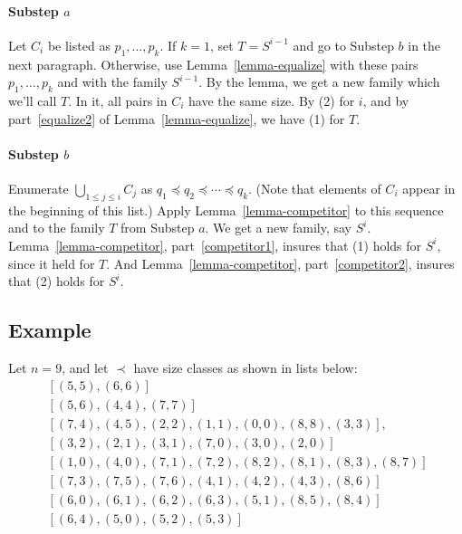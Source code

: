 \documentclass[12pt]{article}
\theoremstyle{definition}
\newcommand{\rem}[1]{\relax}
\begin{document}
 \paragraph{Substep $a$}
 Let $C_i$ be listed as $p_1, \ldots, p_k$.
 If $k = 1$, set $T = S^{i-1}$ and go to  Substep $b$ in the 
 next paragraph.  Otherwise, 
  use Lemma~\ref{lemma-equalize} with these pairs 
  $p_1, \ldots, p_k$ and with the family
  $S^{i-1}$.
  By the lemma, we get a new family which we'll call $T$.
  In it, all pairs in $C_i$ have the same size.
 By (2) for $i$, and by part~\ref{equalize2} of Lemma~\ref{lemma-equalize},
 we have (1) for $T$.
  
 \paragraph{Substep $b$}  
Enumerate $\bigcup_{1\leq j \leq i} C_j$ as 
$q_1 \preceq q_2\preceq \cdots \preceq q_k$.
(Note that elements of $C_i$
appear in the beginning of this list.)
Apply Lemma~\ref{lemma-competitor}
to this sequence and to the family $T$
from Substep $a$.  We get a new family, say 
$S^i$.  
Lemma~\ref{lemma-competitor}, part~\ref{competitor1}, insures that (1) holds for $S^i$, since it held for $T$.
 And Lemma~\ref{lemma-competitor}, part~\ref{competitor2},
 insures that (2) holds for $S^i$.
 
 
 \subsection{Example}
 
 \rem{
 task6 = [[(5,5),(6,6)], [(5,6),(4,4),(7,7)], 
         [(7,4),(4,5),(2, 2),(1,1),(0,0),(8,8), (3,3)], [(3, 2),  (2, 1),(3, 1),(7,0),(3, 0), (2, 0)],
	    [(1, 0), (4,0),(7,1),(7,2), (8,2),(8,1), (8,3), (8,7)], 
         [(7,3), (7,5),(7,6),(4,1),(4,2), (4,3), (8,6)],
	    [(6,0),(6,1),(6,2),(6,3),(5,1), (8,5), (8,4)],
         [(6,4),(5,0),(5,2),(5,3)]]
insertionSort(task6)
}




 Let $n = 9$, and let $\prec$ have size classes as shown in lists below:
 \[
 \begin{array}{l}
\ [(5,5),(6,6)] \\
 \  [(5,6),(4,4),(7,7)] \\
  \  [(7,4),(4,5),(2, 2),(1,1),(0,0),(8,8), (3,3)],\\
  \ [(3, 2),  (2, 1),(3, 1),(7,0),(3, 0), (2, 0)]\\
\	    [(1, 0), (4,0),(7,1),(7,2), (8,2),(8,1), (8,3), (8,7)]\\
 \        [(7,3), (7,5),(7,6),(4,1),(4,2), (4,3), (8,6)] \\
\	    [(6,0),(6,1),(6,2),(6,3),(5,1), (8,5), (8,4)]\\
 \        [(6,4),(5,0),(5,2),(5,3)]
         \end{array}
 \]
\end{document}
